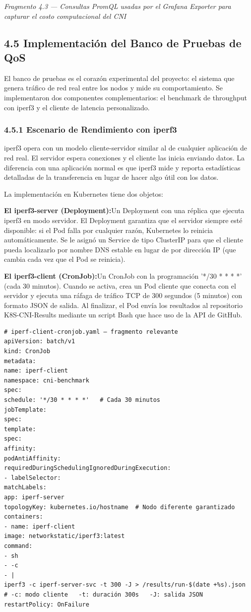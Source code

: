 \documentclass[journal]{IEEEtran}
\begin{document}
\begin{center}\emph{\emph{Fragmento 4.3 --- Consultas PromQL usadas por el Grafana Exporter para capturar el costo computacional del CNI}}\end{center}

\subsection{4.5 Implementación del Banco de Pruebas de QoS}

El banco de pruebas es el corazón experimental del proyecto: el sistema que genera tráfico de red real entre los nodos y mide su comportamiento. Se implementaron dos componentes complementarios: el benchmark de throughput con iperf3 y el cliente de latencia personalizado.

\subsubsection{4.5.1 Escenario de Rendimiento con iperf3}

iperf3 opera con un modelo cliente-servidor similar al de cualquier aplicación de red real. El servidor espera conexiones y el cliente las inicia enviando datos. La diferencia con una aplicación normal es que iperf3 mide y reporta estadísticas detalladas de la transferencia en lugar de hacer algo útil con los datos.

La implementación en Kubernetes tiene dos objetos:

\textbf{El iperf3-server (Deployment):}Un Deployment con una réplica que ejecuta iperf3 en modo servidor. El Deployment garantiza que el servidor siempre esté disponible: si el Pod falla por cualquier razón, Kubernetes lo reinicia automáticamente. Se le asignó un Service de tipo ClusterIP para que el cliente pueda localizarlo por nombre DNS estable en lugar de por dirección IP (que cambia cada vez que el Pod se reinicia).

\textbf{El iperf3-client (CronJob):}Un CronJob con la programación '*/30 * * * *' (cada 30 minutos). Cuando se activa, crea un Pod cliente que conecta con el servidor y ejecuta una ráfaga de tráfico TCP de 300 segundos (5 minutos) con formato JSON de salida. Al finalizar, el Pod envía los resultados al repositorio K8S-CNI-Results mediante un script Bash que hace uso de la API de GitHub.

\begin{lstlisting}[basicstyle=\ttfamily\scriptsize,breaklines=true]
# iperf-client-cronjob.yaml — fragmento relevante
apiVersion: batch/v1
kind: CronJob
metadata:
name: iperf-client
namespace: cni-benchmark
spec:
schedule: '*/30 * * * *'   # Cada 30 minutos
jobTemplate:
spec:
template:
spec:
affinity:
podAntiAffinity:
requiredDuringSchedulingIgnoredDuringExecution:
- labelSelector:
matchLabels:
app: iperf-server
topologyKey: kubernetes.io/hostname  # Nodo diferente garantizado
containers:
- name: iperf-client
image: networkstatic/iperf3:latest
command:
- sh
- -c
- |
iperf3 -c iperf-server-svc -t 300 -J > /results/run-$(date +%s).json
# -c: modo cliente   -t: duración 300s   -J: salida JSON
restartPolicy: OnFailure
\end{lstlisting}
\end{document}
